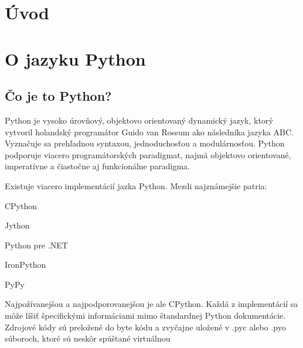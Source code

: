 \documentclass[11pt,oneside,final]{fithesis2}
\begin{document}
 \FrontMatter  
 \ThesisTitlePage

\begin{ThesisDeclaration}
\DeclarationText
\AdvisorName
\end{ThesisDeclaration}

\begin{ThesisThanks}
\end{ThesisThanks}

\begin{ThesisAbstract}
\end{ThesisAbstract}

\begin{ThesisKeyWords}
\end{ThesisKeyWords}



\MainMatter  
\tableofcontents

\chapter{Úvod}
\chapter{O jazyku Python}

	\section{Čo je to Python?}
	Python je vysoko úrovňový, objektovo orientovaný dynamický jazyk, ktorý vytvoril holandský programátor Guido van Rossum ako následníka jazyka ABC.
Vyznačuje sa prehľadnou syntaxou, jednoduchosťou a modulárnosťou. Python podporuje viacero programátorských paradigmat, najmä objektovo orientované, imperatívne a čiastočne aj funkcionálne paradigma.

Existuje viacero implementácií jazka Python. Mezdi najznámejšie patria:
\begin{list}{•}{}
\item CPython
\item Jython
\item Python pre .NET
\item IronPython
\item PyPy
\end{list}

Najpožívanejšou a najpodporovanejšou je ale CPython. Každá z implementácií sa môže líšiť špecifickými informáciami mimo štandardnej Python dokumentácie.
Zdrojové kódy sú preložené do byte kódu a zvyčajne uložené v .pyc alebo .pyo súboroch, ktoré sú neskôr spúštané virtuálnou
\end{document}

